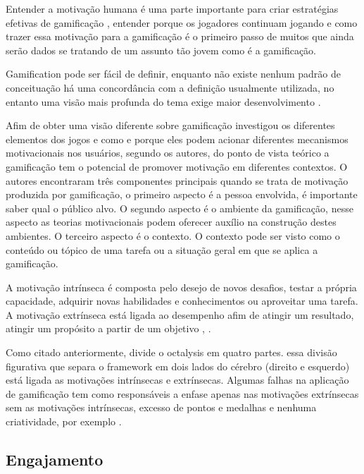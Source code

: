 Entender a motivação humana é uma parte importante para criar estratégias efetivas de gamificação \cite{kumar2013gamification}, entender porque os jogadores continuam jogando e como trazer essa motivação para a gamificação é o primeiro passo de muitos que ainda serão dados se tratando de um assunto tão jovem como é a gamificação.

Gamification pode ser fácil de definir, enquanto não existe nenhum padrão de conceituação há uma concordância com a definição usualmente utilizada, no entanto uma visão mais profunda do tema exige maior desenvolvimento \cite{seaborn2015gamification}. 

Afim de obter uma visão diferente sobre gamificação  \cite{sailer2013psychological} investigou os diferentes elementos dos jogos  e como e porque eles podem acionar diferentes mecanismos motivacionais nos usuários, segundo os autores, do ponto de vista teórico  a gamificação tem o potencial de promover motivação em diferentes contextos. O autores encontraram três componentes principais quando se trata de motivação produzida por gamificação, o primeiro aspecto é a pessoa envolvida, é importante saber qual o público alvo. O segundo aspecto é o ambiente da gamificação, nesse aspecto as teorias motivacionais podem oferecer auxílio na construção destes ambientes. O terceiro aspecto é o contexto. O contexto pode ser visto como o conteúdo ou tópico de uma tarefa ou a situação geral em que se aplica a gamificação.

A motivação intrínseca é composta pelo desejo de novos desafios, testar a própria capacidade, adquirir novas habilidades e conhecimentos ou aproveitar uma tarefa. A motivação extrínseca está ligada ao desempenho afim de atingir um resultado, atingir um propósito a partir de um objetivo \cite{maican2016interactivia}, \cite{chou2015actionable}.


Como citado anteriormente, \cite{chou2015actionable} divide o octalysis em quatro partes. essa divisão figurativa que separa o framework em dois lados do cérebro (direito e esquerdo) está ligada as motivações intrínsecas e extrínsecas. Algumas falhas na aplicação de gamificação tem como responsáveis a enfase apenas nas motivações extrínsecas sem as motivações intrínsecas, excesso de pontos e medalhas e nenhuma criatividade, por exemplo \cite{maican2016interactivia}.

\subsection{Engajamento}

